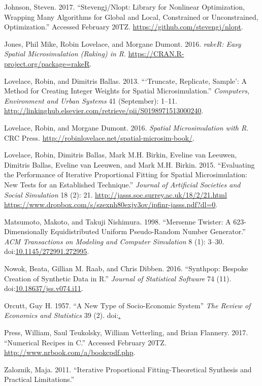 \documentclass[]{article}
\begin{document}
\hypertarget{ref-johnson_stevengjux2fnlopt:_nodate}{}
Johnson, Steven. 2017. ``Stevengj/Nlopt: Library for Nonlinear
Optimization, Wrapping Many Algorithms for Global and Local, Constrained
or Unconstrained, Optimization.'' Accessed February 20TZ.
\url{https://github.com/stevengj/nlopt}.

\hypertarget{ref-jones_raker:_2016}{}
Jones, Phil Mike, Robin Lovelace, and Morgane Dumont. 2016. \emph{rakeR:
Easy Spatial Microsimulation (Raking) in R}.
\url{https://CRAN.R-project.org/package=rakeR}.

\hypertarget{ref-lovelace_truncate_2013}{}
Lovelace, Robin, and Dimitris Ballas. 2013. ```Truncate, Replicate,
Sample': A Method for Creating Integer Weights for Spatial
Microsimulation.'' \emph{Computers, Environment and Urban Systems} 41
(September): 1--11.
\url{http://linkinghub.elsevier.com/retrieve/pii/S0198971513000240}.

\hypertarget{ref-lovelace_spatial_2016}{}
Lovelace, Robin, and Morgane Dumont. 2016. \emph{Spatial Microsimulation
with R}. CRC Press.
\url{http://robinlovelace.net/spatial-microsim-book/}.

\hypertarget{ref-lovelace_evaluating_2015}{}
Lovelace, Robin, Dimitris Ballas, Mark M.H. Birkin, Eveline van Leeuwen,
Dimitris Ballas, Eveline van Leeuwen, and Mark M.H. Birkin. 2015.
``Evaluating the Performance of Iterative Proportional Fitting for
Spatial Microsimulation: New Tests for an Established Technique.''
\emph{Journal of Artificial Societies and Social Simulation} 18 (2): 21.
\href{http://jasss.soc.surrey.ac.uk/18/2/21.html\%20https://www.dropbox.com/s/szexnh80exjv3ov/ipfinr-jasss.pdf?dl=0}{http://jasss.soc.surrey.ac.uk/18/2/21.html https://www.dropbox.com/s/szexnh80exjv3ov/ipfinr-jasss.pdf?dl=0}.

\hypertarget{ref-matsumoto_mersenne_1998}{}
Matsumoto, Makoto, and Takuji Nishimura. 1998. ``Mersenne Twister: A
623-Dimensionally Equidistributed Uniform Pseudo-Random Number
Generator.'' \emph{ACM Transactions on Modeling and Computer Simulation}
8 (1): 3--30.
doi:\href{https://doi.org/10.1145/272991.272995}{10.1145/272991.272995}.

\hypertarget{ref-nowok_synthpop:_2016}{}
Nowok, Beata, Gillian M. Raab, and Chris Dibben. 2016. ``Synthpop:
Bespoke Creation of Synthetic Data in R.'' \emph{Journal of Statistical
Software} 74 (11).
doi:\href{https://doi.org/10.18637/jss.v074.i11}{10.18637/jss.v074.i11}.

\hypertarget{ref-orcutt_new_1957}{}
Orcutt, Guy H. 1957. ``A New Type of Socio-Economic System'' \emph{The Review of Economics and Statistics} 39 (2).
doi:\href{http://www.jstor.org/stable/1928528}.

\hypertarget{ref-press_numerical_nodate}{}
Press, William, Saul Teukolsky, William Vetterling, and Brian Flannery.
2017. ``Numerical Recipes in C.'' Accessed February 20TZ.
\url{http://www.nrbook.com/a/bookcpdf.php}.

\hypertarget{ref-zaloznik_iterative_2011}{}
Zaloznik, Maja. 2011. ``Iterative Proportional Fitting-Theoretical
Synthesis and Practical Limitations.''
\end{document}
